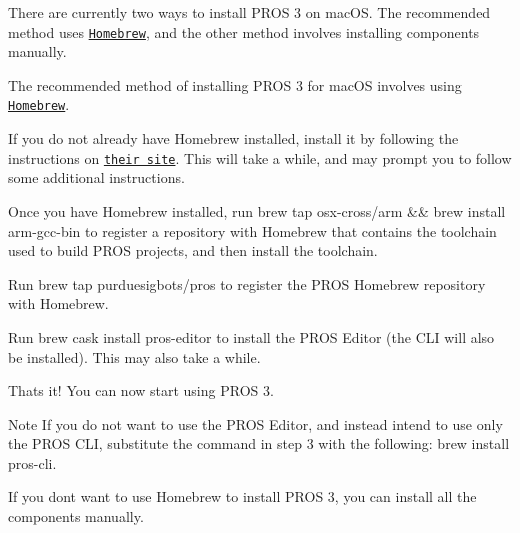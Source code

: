 There are currently two ways to install P\+R\+OS 3 on mac\+OS. The recommended method uses \href{https://brew.sh/}{\tt Homebrew}, and the other method involves installing components manually.

The recommended method of installing P\+R\+OS 3 for mac\+OS involves using \href{https://brew.sh/}{\tt Homebrew}.


\begin{DoxyEnumerate}
\item If you do not already have Homebrew installed, install it by following the instructions on \href{https://brew.sh}{\tt their site}. This will take a while, and may prompt you to follow some additional instructions.
\item Once you have Homebrew installed, run {\ttfamily brew tap osx-\/cross/arm \&\& brew install arm-\/gcc-\/bin} to register a repository with Homebrew that contains the toolchain used to build P\+R\+OS projects, and then install the toolchain.
\item Run {\ttfamily brew tap purduesigbots/pros} to register the P\+R\+OS Homebrew repository with Homebrew.
\item Run {\ttfamily brew cask install pros-\/editor} to install the P\+R\+OS Editor (the C\+LI will also be installed). This may also take a while.
\item That\textquotesingle{}s it! You can now start using P\+R\+OS 3.
\end{DoxyEnumerate}

\begin{DoxyNote}{Note}
If you do not want to use the P\+R\+OS Editor, and instead intend to use only the P\+R\+OS C\+LI, substitute the command in step 3 with the following\+: brew install pros-\/cli.
\end{DoxyNote}


If you don\textquotesingle{}t want to use Homebrew to install P\+R\+OS 3, you can install all the components manually.


